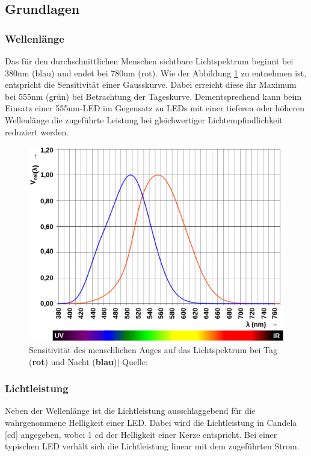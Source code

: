 \documentclass[12pt]{article}
\begin{document}
	\subsection{Grundlagen}
	\subsubsection*{Wellenlänge} \label{Wellenlänge}
	Das für den durchschnittlichen Menschen sichtbare Lichtspektrum beginnt bei 380nm (blau) und endet bei 780nm (rot)\cite{noauthor_v-lambda-kurve_2023}. Wie der Abbildung \ref{fig:batv-lambda-curve} zu entnehmen ist, entspricht die Sensitivität einer Gausskurve. Dabei erreicht diese ihr Maximum bei 555nm (grün) bei Betrachtung der Tageskurve. Dementsprechend kann beim Einsatz einer 555nm-LED im Gegensatz zu LEDs mit einer tieferen oder höheren Wellenlänge die zugeführte Leistung bei gleichwertiger Lichtempfindlichkeit reduziert werden.
	\begin{figure}[H]
		\centering
		\includegraphics[width=0.8\linewidth]{images/BAT_v-lambda-curve}
		\caption{Sensitivität des menschlichen Auges auf das Lichtspektrum bei Tag (\color{red}\textbf{rot}\color{black}) und Nacht (\color{blue}\textbf{blau}\color{black})$\vert$ Quelle: \cite{noauthor_v-lambda-kurve_2023}}
		\label{fig:batv-lambda-curve}
	\end{figure}
	\subsubsection*{Lichtleistung}
	Neben der Wellenlänge ist die Lichtleistung ausschlaggebend für die wahr\-genommene Helligkeit einer LED. Dabei wird die Lichtleistung in Candela [cd] angegeben, wobei 1 cd der Helligkeit einer Kerze entspricht. Bei einer typischen LED verhält sich die Lichtleistung linear mit dem zugeführten Strom.
\end{document}
